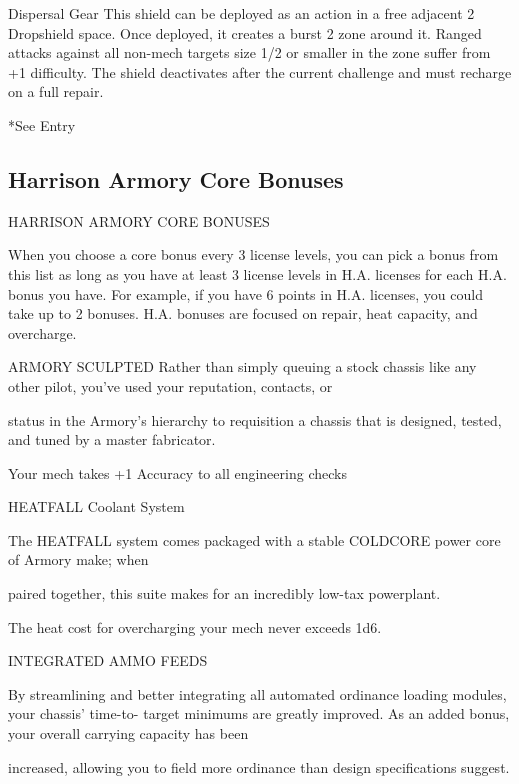  Dispersal          Gear        This shield can be deployed as an action in a free adjacent          2 
 Dropshield                     space. Once deployed, it creates a burst 2 zone around it.  
                                Ranged attacks against all non-mech targets size 1/2 or smaller in  
                                the zone suffer from +1 difficulty. The shield deactivates after the  
                                current challenge and must recharge on a full repair. 

*See Entry  

                                                                                                          
\subsection{Harrison Armory Core Bonuses}

                           HARRISON ARMORY CORE BONUSES  

When you choose a core bonus every 3 license levels, you can pick a bonus from this list as long  
as you have at least 3 license levels in H.A. licenses for each H.A. bonus you have. For example,  
if you have 6 points in H.A. licenses, you could take up to 2 bonuses. H.A. bonuses are focused  
on repair, heat capacity, and overcharge.
 

ARMORY SCULPTED  
Rather than simply queuing a stock chassis like any other pilot, you’ve used your reputation, contacts, or  

status in the Armory’s hierarchy to requisition a chassis that is designed, tested, and tuned by a master  
fabricator.    

Your mech takes +1 Accuracy to all engineering checks
 

HEATFALL Coolant System  

The HEATFALL system comes packaged with a stable COLDCORE power core of Armory make; when  

paired together, this suite makes for an incredibly low-tax powerplant.   

The heat cost for overcharging your mech never exceeds 1d6.
 

INTEGRATED AMMO FEEDS  

By streamlining and better integrating all automated ordinance loading modules, your chassis’ time-to- 
target minimums are greatly improved. As an added bonus, your overall carrying capacity has been  

increased, allowing you to field more ordinance than design specifications suggest.    

